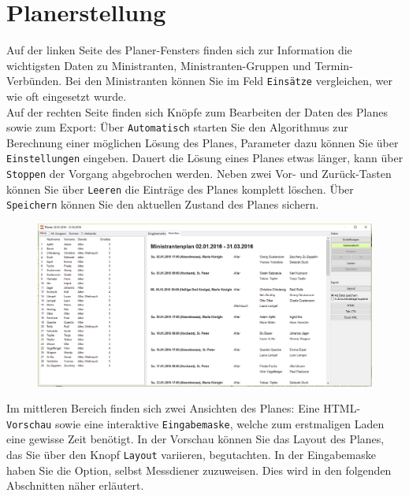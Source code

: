 \documentclass[a4paper,11pt]{article}
\begin{document}
\section{Planerstellung}
Auf der linken Seite des Planer-Fensters finden sich zur Information die wichtigsten Daten zu Ministranten, Ministranten-Gruppen und Termin-Verbünden. Bei den Ministranten können Sie im Feld \texttt{Einsätze} vergleichen, wer wie oft eingesetzt wurde.\\
Auf der rechten Seite finden sich Knöpfe zum Bearbeiten der Daten des Planes sowie zum Export: Über \texttt{Automatisch} starten Sie den Algorithmus zur Berechnung einer möglichen Lösung des Planes, Parameter dazu können Sie über \texttt{Einstellungen} eingeben. Dauert die Lösung eines Planes etwas länger, kann über \texttt{Stoppen} der Vorgang abgebrochen werden. Neben zwei Vor- und Zurück-Tasten können Sie über \texttt{Leeren} die Einträge des Planes komplett löschen. Über \texttt{Speichern} können Sie den aktuellen Zustand des Planes sichern.
\begin{figure}[h]
\includegraphics[scale=0.4]{planer2.PNG}
\end{figure}

Im mittleren Bereich finden sich zwei Ansichten des Planes: Eine HTML-\texttt{Vorschau} sowie eine interaktive \texttt{Eingabemaske}, welche zum erstmaligen Laden eine gewisse Zeit benötigt. In der Vorschau können Sie das Layout des Planes, das Sie über den Knopf \texttt{Layout} variieren, begutachten. In der Eingabemaske haben Sie die Option, selbst Messdiener zuzuweisen. Dies wird in den folgenden Abschnitten näher erläutert.

\end{document}

